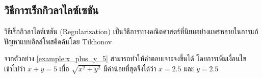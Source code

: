 \subsection{วิธีการเร็กกิวลาไลซ์เซชัน}
\hspace{1cm} วิธีเร็กกิวลาไลซ์เซชัน (Regularization) เป็นวิธีการทางคณิตศาสตร์ที่นิยมอย่างแพร่หลายในการแก้ปัญหาแบบอิลล์โพสคิดค้นโดย Tikhonov \cite{ref:regularization} 

\hspace{1cm} จากตัวอย่าง \ref{example:x_plus_y_5} สามารถทำให้คำตอบเจาะจงขึ้นได้ โดยการเพิ่มเงื่อนไขเข้าไปว่า $x+y=5$ เมื่อ $\sqrt{x^2+y^2}$ มีค่าน้อยที่สุดจึงได้ว่า $x = 2.5$ และ $y = 2.5$